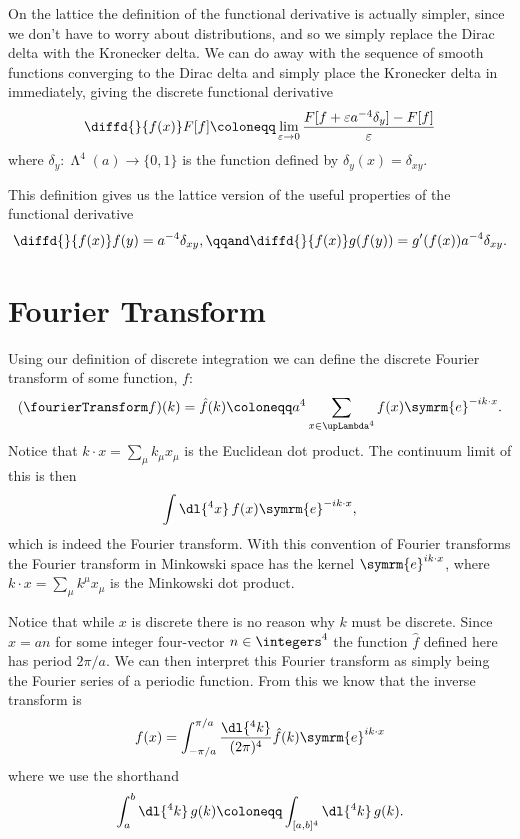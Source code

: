 \documentclass[fleqn]{NotesClass}
\newcommand{\e}{\symrm{e}}
\newcommand{\lattice}[1][4]{\upLambda^{#1}}
\begin{document}
    On the lattice the definition of the functional derivative is actually simpler, since we don't have to worry about distributions, and so we simply replace the Dirac delta with the Kronecker delta.
    We can do away with the sequence of smooth functions converging to the Dirac delta and simply place the Kronecker delta in immediately, giving the discrete functional derivative
    \begin{equation}
       \diffd{}{f(x)}F[f] \coloneqq \lim_{\varepsilon \to 0} \frac{F[f + \varepsilon a^{-4} \delta_y] - F[f]}{\varepsilon}
    \end{equation}
    where \(\delta_y \colon \lattice(a) \to \{0, 1\}\) is the function defined by \(\delta_y(x) = \delta_{xy}\).
    
    This definition gives us the lattice version of the useful properties of the functional derivative
    \begin{equation}
        \diffd{}{f(x)}f(y) = a^{-4}\delta_{xy}, \qqand \diffd{}{f(x)} g(f(y)) = g'(f(x))a^{-4}\delta_{xy}.
    \end{equation}
    
    \section{Fourier Transform}
    Using our definition of discrete integration we can define the discrete Fourier transform of some function, \(f\):
    \begin{equation}
        (\fourierTransform f)(k) = \hat{f}(k) \coloneqq a^4 \sum_{x\in\lattice}f(x) \e^{-ik\cdot x}.
    \end{equation}
    Notice that \(k \cdot x = \sum_\mu k_\mu x_\mu\) is the Euclidean dot product.
    The continuum limit of this is then
    \begin{equation}
        \int \dl{^4x} \, f(x)\e^{-ik\cdot x},
    \end{equation}
    which is indeed the Fourier transform.
    With this convention of Fourier transforms the Fourier transform in Minkowski space has the kernel \(\e^{ik \cdot x}\), where \(k \cdot x = \sum_\mu k^\mu x_\mu\) is the Minkowski dot product.
    
    Notice that while \(x\) is discrete there is no reason why \(k\) must be discrete.
    Since \(x = an\) for some integer four-vector \(n \in \integers^4\) the function \(\hat{f}\) defined here has period \(2\pi/a\).
    We can then interpret this Fourier transform as simply being the Fourier series of a periodic function.
    From this we know that the inverse transform is
    \begin{equation}
        f(x) = \int_{-\pi/a}^{\pi/a} \frac{\dl{^4k}}{(2\pi)^4} \hat{f}(k)\e^{ik\cdot x}
    \end{equation}
    where we use the shorthand
    \begin{equation}
        \int_a^b \dl{^4k} \, g(k) \coloneqq \int_{[a, b]^{4}} \dl{^4k} \, g(k).
    \end{equation}
    
\end{document}
